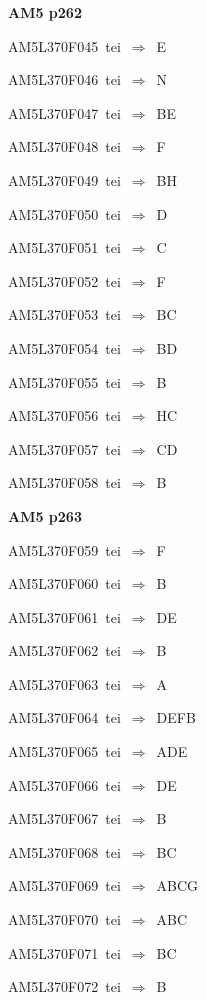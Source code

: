 \par\vfill\eject
{\bf\hfill AM5 p262\hfill\hbox{}}\par\bigskip
{\sixrm AM5L370F045\ {\sixit tei}\ }$\Rightarrow$\ E\par\smallskip
{\sixrm AM5L370F046\ {\sixit tei}\ }$\Rightarrow$\ N\par\smallskip
{\sixrm AM5L370F047\ {\sixit tei}\ }$\Rightarrow$\ BE\par\smallskip
{\sixrm AM5L370F048\ {\sixit tei}\ }$\Rightarrow$\ F\par\smallskip
{\sixrm AM5L370F049\ {\sixit tei}\ }$\Rightarrow$\ BH\par\smallskip
{\sixrm AM5L370F050\ {\sixit tei}\ }$\Rightarrow$\ D\par\smallskip
{\sixrm AM5L370F051\ {\sixit tei}\ }$\Rightarrow$\ C\par\smallskip
{\sixrm AM5L370F052\ {\sixit tei}\ }$\Rightarrow$\ F\par\smallskip
{\sixrm AM5L370F053\ {\sixit tei}\ }$\Rightarrow$\ BC\par\smallskip
{\sixrm AM5L370F054\ {\sixit tei}\ }$\Rightarrow$\ BD\par\smallskip
{\sixrm AM5L370F055\ {\sixit tei}\ }$\Rightarrow$\ B\par\smallskip
{\sixrm AM5L370F056\ {\sixit tei}\ }$\Rightarrow$\ HC\par\smallskip
{\sixrm AM5L370F057\ {\sixit tei}\ }$\Rightarrow$\ CD\par\smallskip
{\sixrm AM5L370F058\ {\sixit tei}\ }$\Rightarrow$\ B\par\smallskip

\par\vfill\eject
{\bf\hfill AM5 p263\hfill\hbox{}}\par\bigskip
{\sixrm AM5L370F059\ {\sixit tei}\ }$\Rightarrow$\ F\par\smallskip
{\sixrm AM5L370F060\ {\sixit tei}\ }$\Rightarrow$\ B\par\smallskip
{\sixrm AM5L370F061\ {\sixit tei}\ }$\Rightarrow$\ DE\par\smallskip
{\sixrm AM5L370F062\ {\sixit tei}\ }$\Rightarrow$\ B\par\smallskip
{\sixrm AM5L370F063\ {\sixit tei}\ }$\Rightarrow$\ A\par\smallskip
{\sixrm AM5L370F064\ {\sixit tei}\ }$\Rightarrow$\ DEFB\par\smallskip
{\sixrm AM5L370F065\ {\sixit tei}\ }$\Rightarrow$\ ADE\par\smallskip
{\sixrm AM5L370F066\ {\sixit tei}\ }$\Rightarrow$\ DE\par\smallskip
{\sixrm AM5L370F067\ {\sixit tei}\ }$\Rightarrow$\ B\par\smallskip
{\sixrm AM5L370F068\ {\sixit tei}\ }$\Rightarrow$\ BC\par\smallskip
{\sixrm AM5L370F069\ {\sixit tei}\ }$\Rightarrow$\ ABCG\par\smallskip
{\sixrm AM5L370F070\ {\sixit tei}\ }$\Rightarrow$\ ABC\par\smallskip
{\sixrm AM5L370F071\ {\sixit tei}\ }$\Rightarrow$\ BC\par\smallskip
{\sixrm AM5L370F072\ {\sixit tei}\ }$\Rightarrow$\ B\par\smallskip

